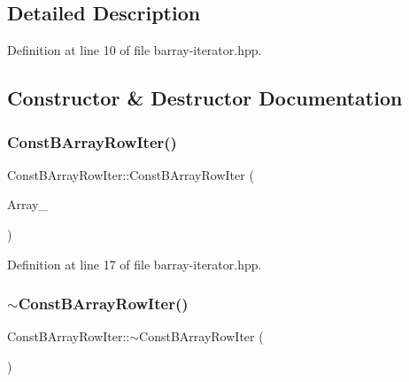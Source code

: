 \subsection{Detailed Description}


Definition at line 10 of file barray-\/iterator.\+hpp.



\subsection{Constructor \& Destructor Documentation}
\mbox{\label{class_const_b_array_row_iter_a12fff3688dc55bdb336f5504736b6ebc}} 
\subsubsection{\texorpdfstring{Const\+B\+Array\+Row\+Iter()}{ConstBArrayRowIter()}}
{\footnotesize\ttfamily Const\+B\+Array\+Row\+Iter\+::\+Const\+B\+Array\+Row\+Iter (\begin{DoxyParamCaption}\item[{const \hyperlink{class_b_array}{B\+Array} $\ast$}]{Array\+\_\+ }\end{DoxyParamCaption})\hspace{0.3cm}{\ttfamily [inline]}}



Definition at line 17 of file barray-\/iterator.\+hpp.

\mbox{\label{class_const_b_array_row_iter_aca51d35c5730466345e4c8bb303f619e}} 
\subsubsection{\texorpdfstring{$\sim$\+Const\+B\+Array\+Row\+Iter()}{~ConstBArrayRowIter()}}
{\footnotesize\ttfamily Const\+B\+Array\+Row\+Iter\+::$\sim$\+Const\+B\+Array\+Row\+Iter (\begin{DoxyParamCaption}{ }\end{DoxyParamCaption})\hspace{0.3cm}{\ttfamily [inline]}}




